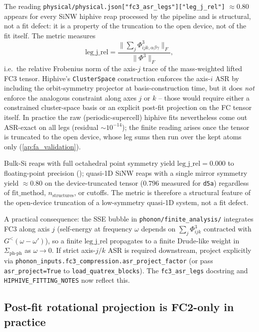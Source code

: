 The reading
\texttt{physical/physical.json["fc3\_asr\_legs"]["leg\_j\_rel"]}
$\approx 0.80$ appears for every SiNW hiphive reap processed by the
pipeline and is structural, not a fit defect: it is a property of the
truncation to the open device, not of the fit itself.  The metric
measures
\begin{equation}
  \mathrm{leg\_j\_rel} =
  \frac{\bigl\| \sum_j \Phi^3_{ijk,\alpha\beta\gamma} \bigr\|_F}{\| \Phi^3 \|_F},
\end{equation}
i.e.\ the relative Frobenius norm of the axis-$j$ trace of the
mass-weighted lifted FC3 tensor.  Hiphive's \texttt{ClusterSpace}
construction enforces the axis-$i$ ASR by including the orbit-symmetry
projector at basis-construction time, but it does \emph{not} enforce
the analogous constraint along axes $j$ or $k$ -- those would require
either a constrained cluster-space basis or an explicit post-fit
projection on the FC tensor itself.  In practice the raw
(periodic-supercell) hiphive fits nevertheless come out ASR-exact on
all legs (residual $\sim10^{-14}$); the finite reading arises once the
tensor is truncated to the open device, whose leg sums then run over
the kept atoms only (\cref{ap:fa_validation}).

Bulk-Si reaps with full octahedral point symmetry yield
$\mathrm{leg\_j\_rel} = 0.000$ to floating-point precision
(); quasi-1D SiNW reaps with a single
mirror symmetry yield $\approx 0.80$ on the device-truncated tensor
($0.796$ measured for \texttt{d5a}) regardless of
$\mathrm{fit\_method}$, $n_\mathrm{structures}$, or cutoffs.  The
metric is therefore a structural feature of the open-device truncation
of a low-symmetry quasi-1D system, not a fit defect.

A practical consequence: the SSE bubble in
\texttt{phonon/finite\_analysis/} integrates FC3 along axis $j$
(self-energy at frequency $\omega$ depends on $\sum_j \Phi^3_{ijk}$
contracted with $G^<(\omega-\omega')$), so a finite
$\mathrm{leg\_j\_rel}$ propagates to a finite Drude-like weight in
$\Sigma_\mathrm{ph\text{-}ph}$ as $\omega \to 0$.  If strict axis-$j/k$
ASR is required downstream, project explicitly via
\texttt{phonon\_inputs.fc3\_compression.asr\_project\_factor} (or pass
\texttt{asr\_project=True} to \texttt{load\_quatrex\_blocks}).  The
\texttt{fc3\_asr\_legs} docstring and \texttt{HIPHIVE\_FITTING\_NOTES}
now reflect this.

\subsection{Post-fit rotational projection is FC2-only in practice}
\label{sec:rsr_fc2_only}


